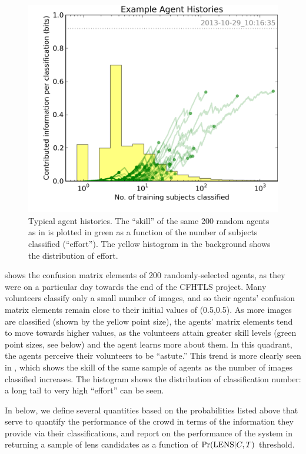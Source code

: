 \documentclass[useAMS,usenatbib,a4paper]{mn2e}
\begin{document}
\begin{figure}
\centering\includegraphics[width=0.9\linewidth]{sw-system-figs/CFHTLS_2013-10-29_10:16:35_histories.png}
\caption{Typical \SW agent histories. The ``skill'' of the  same 200 random
agents  as in  is plotted in green as a function
of the number  of subjects classified (``effort''). The yellow histogram in
the background shows the distribution of effort.}
\label{fig:swap:agent-histories}
\end{figure}

 shows the confusion matrix elements of 200
randomly-selected agents, as they were on a particular day towards the end of
the CFHTLS project. Many volunteers classify  only a small number of images, and
so their agents' confusion matrix elements remain close to their initial values
of (0.5,0.5). As more images are classified (shown by the yellow point size),
the agents' matrix elements tend to move towards higher values, as the
volunteers attain greater skill levels (green point sizes, see
 below) and the agent learns more about them. In this
quadrant, the agents perceive their volunteers to be ``astute.'' This trend is
more clearly seen in , which shows the skill of
the same sample of agents as the number of images classified increases. The
histogram shows the distribution of classification number: a long tail to very
high ``effort'' can be seen.

In  below, we define several quantities based on the
probabilities listed above that serve to quantify the performance of the crowd
in terms of the information they provide via their classifications, and report
on the performance of the system in returning a sample of lens candidates
as a function of ${\rm Pr}({\rm LENS}|C,T)$ threshold.
\end{document}
